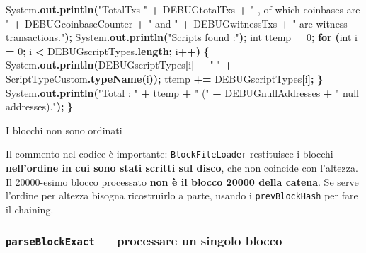 \documentclass[
  italian,
  openany]{book}
\newenvironment{Shaded}{\begin{snugshade}}{\end{snugshade}}
\newcommand{\BuiltInTok}[1]{#1}
\newcommand{\ControlFlowTok}[1]{\textcolor[rgb]{0.13,0.29,0.53}{\textbf{#1}}}
\newcommand{\DataTypeTok}[1]{\textcolor[rgb]{0.13,0.29,0.53}{#1}}
\newcommand{\DecValTok}[1]{\textcolor[rgb]{0.00,0.00,0.81}{#1}}
\newcommand{\FunctionTok}[1]{\textcolor[rgb]{0.13,0.29,0.53}{\textbf{#1}}}
\newcommand{\NormalTok}[1]{#1}
\newcommand{\OperatorTok}[1]{\textcolor[rgb]{0.81,0.36,0.00}{\textbf{#1}}}
\newcommand{\StringTok}[1]{\textcolor[rgb]{0.31,0.60,0.02}{#1}}
\begin{document}
\begin{Shaded}
\begin{Highlighting}[]
    \BuiltInTok{System}\OperatorTok{.}\FunctionTok{out}\OperatorTok{.}\FunctionTok{println}\OperatorTok{(}\StringTok{"TotalTxs "} \OperatorTok{+}\NormalTok{ DEBUGtotalTxs}
        \OperatorTok{+} \StringTok{" , of which coinbases are "} \OperatorTok{+}\NormalTok{ DEBUGcoinbaseCounter}
        \OperatorTok{+} \StringTok{" and "} \OperatorTok{+}\NormalTok{ DEBUGwitnessTxs }\OperatorTok{+} \StringTok{" are witness transactions."}\OperatorTok{);}
    \BuiltInTok{System}\OperatorTok{.}\FunctionTok{out}\OperatorTok{.}\FunctionTok{println}\OperatorTok{(}\StringTok{"Scripts found :"}\OperatorTok{);}
    \DataTypeTok{int}\NormalTok{ ttemp }\OperatorTok{=} \DecValTok{0}\OperatorTok{;}
    \ControlFlowTok{for} \OperatorTok{(}\DataTypeTok{int}\NormalTok{ i }\OperatorTok{=} \DecValTok{0}\OperatorTok{;}\NormalTok{ i }\OperatorTok{\textless{}}\NormalTok{ DEBUGscriptTypes}\OperatorTok{.}\FunctionTok{length}\OperatorTok{;}\NormalTok{ i}\OperatorTok{++)} \OperatorTok{\{}
        \BuiltInTok{System}\OperatorTok{.}\FunctionTok{out}\OperatorTok{.}\FunctionTok{println}\OperatorTok{(}\NormalTok{DEBUGscriptTypes}\OperatorTok{[}\NormalTok{i}\OperatorTok{]} \OperatorTok{+} \StringTok{" "} \OperatorTok{+}\NormalTok{ ScriptTypeCustom}\OperatorTok{.}\FunctionTok{typeName}\OperatorTok{(}\NormalTok{i}\OperatorTok{));}
\NormalTok{        ttemp }\OperatorTok{+=}\NormalTok{ DEBUGscriptTypes}\OperatorTok{[}\NormalTok{i}\OperatorTok{];}
    \OperatorTok{\}}
    \BuiltInTok{System}\OperatorTok{.}\FunctionTok{out}\OperatorTok{.}\FunctionTok{println}\OperatorTok{(}\StringTok{"Total : "} \OperatorTok{+}\NormalTok{ ttemp }\OperatorTok{+} \StringTok{" ("} \OperatorTok{+}\NormalTok{ DEBUGnullAddresses }\OperatorTok{+} \StringTok{" null addresses)."}\OperatorTok{);}
\OperatorTok{\}}
\end{Highlighting}
\end{Shaded}

\begin{calloutwarning}{I blocchi non sono ordinati}

Il commento nel codice è importante: \texttt{BlockFileLoader}
restituisce i blocchi \textbf{nell'ordine in cui sono stati scritti sul
disco}, che non coincide con l'altezza. Il 20000-esimo blocco processato
\textbf{non è il blocco 20000 della catena}. Se serve l'ordine per
altezza bisogna ricostruirlo a parte, usando i \texttt{prevBlockHash}
per fare il chaining.

\end{calloutwarning}

\subsubsection{\texorpdfstring{\texttt{parseBlockExact} --- processare
un singolo
blocco}{parseBlockExact --- processare un singolo blocco}}\label{parseblockexact-processare-un-singolo-blocco}
\end{document}
